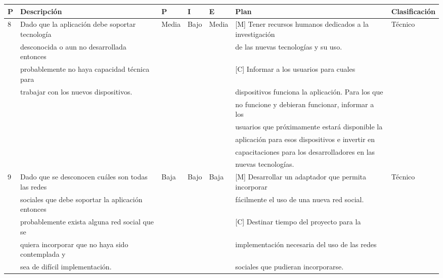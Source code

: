 \begin{landscape}
\begin{table}
\centering
\begin{tabular}{| l | l | l | l | l | l | l | }
	     \hline
P & Descripción & P & I & E & Plan & Clasificación \\ \hline

8 & Dado que la aplicación debe soportar tecnología & Media & Bajo & Media & [M] Tener recursos humanos dedicados a la investigación& Técnico\\
  & desconocida o aun no desarrollada entonces  & & & &				de las nuevas tecnologías y su uso. & \\
  & probablemente no haya capacidad técnica para  & & & &			[C] Informar a los usuarios para cuales & \\
  & trabajar con los nuevos dispositivos.			  & & & & 		dispositivos funciona la aplicación. Para los que & \\ 
  &&&&																&no funcione y debieran funcionar, informar a los & \\ 		  &&&&																& usuarios que próximamente estará disponible la& \\
  &&&&																& aplicación para esos dispositivos e invertir en & \\
  &&&&																& capacitaciones para los desarrolladores en las &\\
  &&&&																& nuevas tecnologías. &\\  \hline

9 & Dado que se desconocen cuáles son todas las redes & Baja & Bajo & Baja & [M] Desarrollar un adaptador que permita incorporar  & Técnico\\
  & sociales que debe soportar la aplicación entonces  & & & &		fácilmente el uso de una nueva red social. & \\
  & probablemente exista alguna red social que se  & & & &			[C] Destinar tiempo del proyecto para la & \\
  & quiera incorporar que no haya sido contemplada y	 & & & &	implementación necesaria del uso de las redes  & \\ 
  & sea de difícil implementación.&&&								&sociales que pudieran incorporarse. & \\ \hline


\end{tabular}
\end{table}
\end{landscape}
